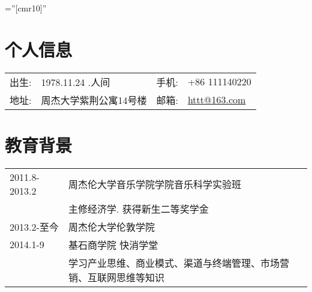 \documentclass[a4paper]{article} %
\newcommand{\xiaowu}{\fontsize{9pt}{\baselineskip}\selectfont}
\begin{document}
\xiaowu
\pagestyle{empty} %

\font\fb=''[cmr10]'' %


\par{\bigskip\par} %

\section{个人信息}

\begin{tabular}{rlrl}
\textsc{出生:} & 1978.11.24 .人间
&\textsc{手机:} & +86 111140220\\

\textsc{地址:} &周杰大学紫荆公寓14号楼
&\textsc{邮箱:} & \href{httt@163.com}{httt@163.com}\\
\end{tabular}

\section{教育背景}
\begin{tabular}{l|l}	


  2011.8-2013.2
   & 周杰伦大学音乐学院学院音乐科学实验班\\
   &  \footnotesize{主修经济学. 获得新生二等奖学金}\\
	2013.2-至今
  \vspace{0.4em}
	&  周杰伦大学伦敦学院\\
	2014.1-9
   &基石商学院 快消学堂\\
   &  \footnotesize{学习产业思维、商业模式、渠道与终端管理、市场营销、互联网思维等知识}\\
\end{tabular}


\end{document}
